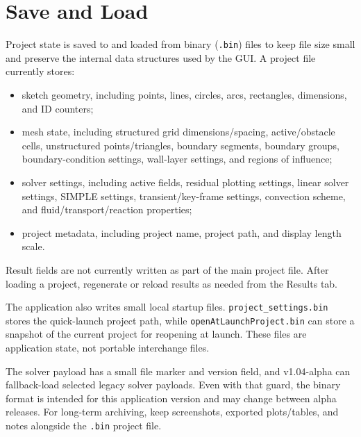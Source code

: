 \documentclass[11pt]{article}
\begin{document}
\section{Save and Load}
Project state is saved to and loaded from binary (\texttt{.bin}) files to keep file
size small and preserve the internal data structures used by the GUI. A project file
currently stores:
\begin{itemize}[nosep]
  \item sketch geometry, including points, lines, circles, arcs, rectangles,
        dimensions, and ID counters;
  \item mesh state, including structured grid dimensions/spacing, active/obstacle
        cells, unstructured points/triangles, boundary segments, boundary groups,
        boundary-condition settings, wall-layer settings, and regions of influence;
  \item solver settings, including active fields, residual plotting settings, linear
        solver settings, SIMPLE settings, transient/key-frame settings, convection
        scheme, and fluid/transport/reaction properties;
  \item project metadata, including project name, project path, and display length
        scale.
\end{itemize}

Result fields are not currently written as part of the main project file. After
loading a project, regenerate or reload results as needed from the Results tab.

The application also writes small local startup files. \texttt{project\_settings.bin}
stores the quick-launch project path, while \texttt{openAtLaunchProject.bin} can store
a snapshot of the current project for reopening at launch. These files are application
state, not portable interchange files.

The solver payload has a small file marker and version field, and v1.04-alpha can
fallback-load selected legacy solver payloads. Even with that guard, the binary format
is intended for this application version and may change between alpha releases. For
long-term archiving, keep screenshots, exported plots/tables, and notes alongside the
\texttt{.bin} project file.

\end{document}
